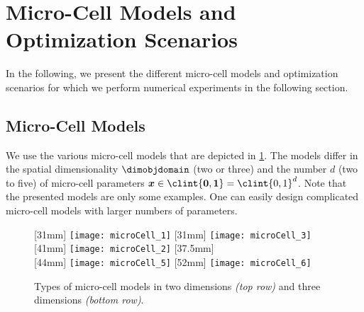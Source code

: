 \section{Micro-Cell Models and Optimization Scenarios}
\label{sec:63models}


\noindent
In the following, we present the different micro-cell models
and optimization scenarios for which we perform numerical
experiments in the following section.



\subsection{Micro-Cell Models}
\label{sec:631models}

We use the various micro-cell models that are depicted in \cref{fig:microCell}.
The models differ in the spatial dimensionality $\dimobjdomain$ (two or three)
and the number $d$ (two to five) of micro-cell parameters
$\*x \in \clint{\*0, \*1} = \clint{0, 1}^d$.
Note that the presented models are only some examples.
One can easily design complicated micro-cell models
with larger numbers of parameters.

\begin{figure}
  [31mm]{%
    \texttt{[image: microCell\_1]}%
  }%
  \hfill%
  [31mm]{%
    \texttt{[image: microCell\_3]}%
  }%
  \hfill%
  [41mm]{%
    \texttt{[image: microCell\_2]}%
  }%
  \hfill%
  [37.5mm]{%
    \hspace*{-45mm}%
  }\\[2mm]%
  [44mm]{%
    \texttt{[image: microCell\_5]}%
  }%
  \qquad%
  [52mm]{%
    \texttt{[image: microCell\_6]}%
  }%
  \caption[Types of micro-cell models]{%
    Types of micro-cell models in two dimensions \emph{(top row)}
    and three dimensions \emph{(bottom row)}.%
  }%
  \label{fig:microCell}%
\end{figure}

